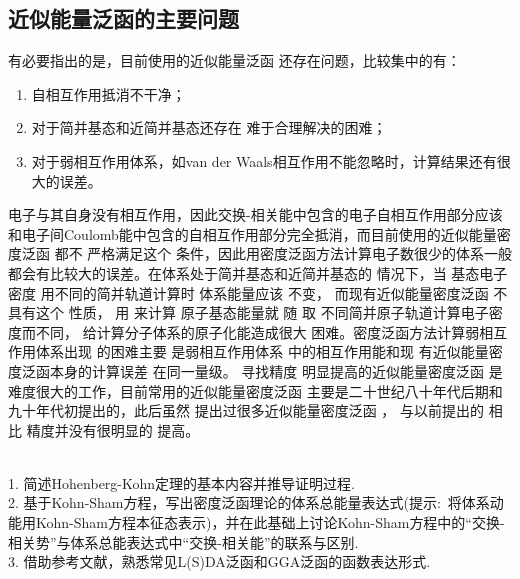 \subsection{近似能量泛函的主要问题}
有必要指出的是，目前使用的{近似能量}泛函%
还存在问题，比较集中的有：
\begin{enumerate}
	\item 自相互作用抵消不干净；
	\item 对于简并基态和近简并基态还存在%
{难于合理解决的困难}；
	\item 对于弱相互作用体系，如van der Waals相互作用不能忽略时，{计算结果}还有很大的误差。%
\end{enumerate}
电子与{其}自身没有相互作用，因此交换-相关能中包含的电子自相互作用部分应该和电子间Coulomb能中包含的自相互作用部分完全抵消，而目前使用的{近似能量密度}泛函%
都不%
{严格满足}这个%
{条件}，因此{用}密度泛函方法计算电子数很少的体系一般都会有比较大的误差。{在体系处于}简并基态和近简并基态的%
{情况下}，当%
基态电子密度%
{用}不同的简并轨道{计算}时%
体系能量应该%
{不变}，%
{而现有近似能量密度}泛函%
不具有这个%
{性质}，%
用%
{来}计算%
原子基态能量就%
随%
取%
不同简并原子轨道{计算电子密度}而不同\cite{PRB43-6865_1991,CPL265-481_1997}，%
给计算分子体系的原子化能造成很大%
困难。密度泛函方法计算弱相互作用体系出现%
的{困难}主要%
是弱相互作用体系%
{中的相互作用}能和现%
{有近似能量密度泛函}本身的{计算}误差%
{在同一量级}。%
寻找精度%
明显提高的近似能量密度泛函%
是难度很大的工作，目前常用的{近似能量密度}泛函%
主要是二十世纪八十年代后期和九十年代初提出的，此后虽然%
{提出过很多}近似{能量密度}泛函%
，%
与以前提出的%
相比%
{精度并}没有很明显的%
{提高}。

\\
1. 简述\textrm{Hohenberg-Kohn}定理的基本内容并推导证明过程.\\
2. 基于\textrm{Kohn-Sham}方程，写出密度泛函理论的体系总能量表达式(提示:~将体系动能用Kohn-Sham方程本征态表示)，并在此基础上讨论\textrm{Kohn-Sham}方程中的``交换-相关势''与体系总能表达式中``交换-相关能''的联系与区别.\\
3. 借助参考文献，熟悉常见\textrm{L(S)DA}泛函和\textrm{GGA}泛函的函数表达形式.%

